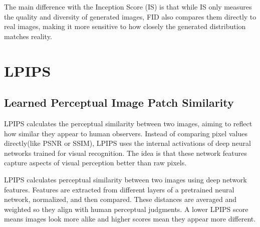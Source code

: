 The main difference with the Inception Score (IS) is that while IS only measures the quality and diversity of generated images, FID also
compares them directly to real images, making it more sensitive to how closely the generated distribution matches reality.


\clearpage
\thispagestyle{genaistyle}
\section{LPIPS}
\subsection{Learned Perceptual Image Patch Similarity}


LPIPS calculates the perceptual similarity between two images, aiming to reflect how similar they appear to human observers.
Instead of comparing pixel values directly(like PSNR or SSIM), LPIPS uses the internal activations of deep neural networks trained for
visual recognition. The idea is that these network features capture aspects of visual perception better than raw pixels.

\begin{center}
\end{center}

LPIPS calculates perceptual similarity between two images using deep network features. Features are extracted from different layers of a
pretrained neural network, normalized, and then compared. These distances are averaged and weighted so they align with human perceptual judgments.
A lower LPIPS score means images look more alike and higher scores mean they appear more different.

